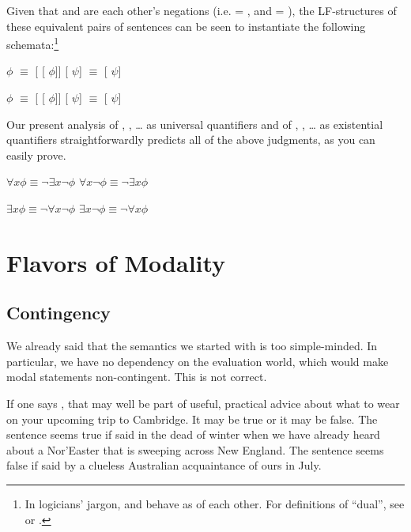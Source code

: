 Given that  and  are each other's negations
(i.e.  = , and  = ), the
LF-structures of these equivalent pairs of sentences can be seen to instantiate
the following schemata:\footnote{In logicians' jargon,  and
   behave as  of each other. For definitions of
  ``dual'', see \citet[197]{barwise-cooper:1981:generalized} or
  \citet[vol.2,238]{gamut:91}.}

\pex \a {} $\phi$ $\equiv$  [
[ $\phi$]] \a {} [
\ensuremath{\psi}] $\equiv$  [
\ensuremath{\psi}] \xe

\pex \a {} $\phi$ $\equiv$  [
[ $\phi$]] \a {} [
\ensuremath{\psi}] $\equiv$  [
\ensuremath{\psi}] \xe

Our present analysis of , , \dots{} as
universal quantifiers and of , , \dots{} as
existential quantifiers straightforwardly predicts all of the above judgments,
as you can easily prove.

\pex \a $\forall x \phi \equiv \neg \exists x \neg \phi$ \a $\forall x \neg
\phi \equiv \neg \exists x \phi$ \xe

\pex \a $\exists x \phi \equiv \neg \forall x \neg \phi$ \a $\exists x \neg \phi
\equiv \neg \forall x \phi$ \xe

\section{Flavors of Modality} \label{sec:flavors}

\subsection{Contingency} \label{sec:contingency}

We already said that the semantics we started with is too
simple-minded. In particular, we have no dependency on the evaluation
world, which would make modal statements non-contingent. This is not
correct.

If one says , that may well
be part of useful, practical advice about what to wear on your
upcoming trip to Cambridge. It may be true or it may be false. The
sentence seems true if said in the dead of winter when we have already
heard about a Nor'Easter that is sweeping across New England. The
sentence seems false if said by a clueless Australian acquaintance of
ours in July.

